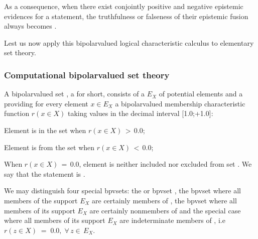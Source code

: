 \documentclass[a4paper,12pt,english]{sphinxhowto}
\begin{document}
\sphinxAtStartPar
As a consequence, when there exist conjointly positive and negative epistemic evidences for a statement, the truthfulness or falseness of their epistemic fusion always becomes .

\sphinxAtStartPar
Lest us now apply this bipolar\sphinxhyphen{}valued logical characteristic calculus to elementary set theory.


\subsubsection{Computational bipolar\sphinxhyphen{}valued set theory}
\label{\detokenize{pearls:computational-bipolar-valued-set-theory}}
\begin{DUlineblock}{0em}
\item[] A bipolar\sphinxhyphen{}valued set , a  for short, consists of a  \(E_X\) of potential elements and a  providing for every element \(x \in E_X\) a bipolar\sphinxhyphen{}valued membership characteristic function \(r(x \in X)\) taking values in the decimal interval {[}\sphinxhyphen{}1.0;+1.0{]}:
\item[]
\begin{DUlineblock}{\DUlineblockindent}
\item[] \sphinxhyphen{} Element  is   in the set  when \(r(x \in X) \,>\, 0.0\);
\item[] \sphinxhyphen{} Element  is   from the set  when \(r(x \in X) \,<\, 0.0\);
\item[] \sphinxhyphen{} When  \(r(x \in X)\,=\, 0.0\), element  is neither included nor excluded from set . We say that the statement is .
\end{DUlineblock}
\end{DUlineblock}

\sphinxAtStartPar
We may distinguish four special bpv\sphinxhyphen{}sets: the  or  bpv\sphinxhyphen{}set , the  bpv\sphinxhyphen{}set  where all members of the support \(E_X\) are certainly members of , the  bpv\sphinxhyphen{}set  where all members of its support \(E_X\) are certainly non\sphinxhyphen{}members of  and the special  case where all members of its support \(E_X\) are indeterminate members of , i.e \(r(z \in X) \;=\; 0.0 , \; \forall \,z \in\, E_X\).
\end{document}
